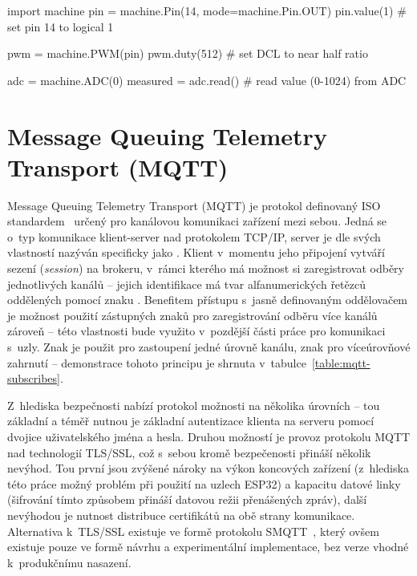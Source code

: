\begin{code}[language=Python,caption={Ukázka práce s~periferiemi čipu pomocí vestavěných knihoven jazyka MicroPython
-- v~první části se jedná o~nastavení pinu na logickou hodnotu 1, prostřední část patří nastavení pulzně šířkové
modulace (PWM) na pinu čipu a konec je ve znamení čtení z~prvního kanálu analogově-digitálního převodníku (ADC).}]
import machine
pin = machine.Pin(14, mode=machine.Pin.OUT)
pin.value(1) # set pin 14 to logical 1

pwm = machine.PWM(pin)
pwm.duty(512) # set DCL to near half ratio

adc = machine.ADC(0)
measured = adc.read() # read value (0-1024) from ADC
\end{code}

\section{Message Queuing Telemetry Transport (MQTT)}\label{sec:mqtt}
Message Queuing Telemetry Transport (MQTT) je protokol definovaný ISO standardem~\cite{ISOMQTT} určený pro
kanálovou komunikaci zařízení mezi sebou.
Jedná se o~typ komunikace klient-server nad protokolem TCP/IP, server je dle svých vlastností nazýván
specificky jako .
Klient v~momentu jeho připojení vytváří sezení (\textit{session}) na brokeru, v~rámci kterého má možnost si zaregistrovat
odběry jednotlivých kanálů -- jejich identifikace má tvar alfanumerických řetězců oddělených pomocí znaku \ic{/}.
Benefitem přístupu s~jasně definovaným oddělovačem je možnost použití zástupných znaků pro
zaregistrování odběru více kanálů zároveň -- této vlastnosti bude využito v~pozdější části práce pro komunikaci s~uzly.
Znak \ic{+} je použit pro zastoupení jedné úrovně kanálu, znak \ic{#} pro víceúrovňové zahrnutí -- demonstrace tohoto
principu je shrnuta v~tabulce~\ref{table:mqtt-subscribes}.

Z~hlediska bezpečnosti nabízí protokol možnosti na několika úrovních -- tou základní a téměř nutnou je základní
autentizace klienta na serveru pomocí dvojice uživatelského jména a hesla.
Druhou možností je provoz protokolu MQTT nad technologií TLS/SSL, což s~sebou kromě bezpečenosti přináší několik nevýhod.
Tou první jsou zvýšené nároky na výkon koncových zařízení (z~hlediska této práce možný problém při použití na
uzlech ESP32) a kapacitu datové linky (šifrování tímto způsobem přináší datovou režii přenášených zpráv), další
nevýhodou je nutnost distribuce certifikátů na obě strany komunikace.
Alternativa k~TLS/SSL existuje ve formě protokolu SMQTT~\cite{SMQTT}, který
ovšem existuje pouze ve formě návrhu a experimentální implementace, bez verze vhodné k~produkčnímu nasazení.

